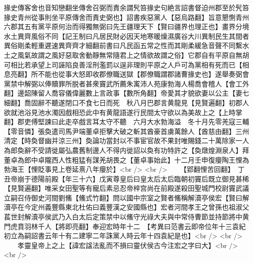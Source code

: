 掾史傳客舍也音知戀翻坐傳舍召弼而責余謂髠笞掾史句絶言詔書督迫州郡至於髠笞掾史青州從事則坐平原傳舍而責史弼也】詔書疾惡黨人【惡烏路翻】旨意懇惻青州六郡其五有黨平原何治而得獨無弼曰先王疆理天下【賢曰疆界也理正也】畫界分境水土異齊風俗不同【記王制曰凡居民財必因天地寒暖燥濕廣谷大川異制民生其間者異俗剛柔輕重遲速異齊齊才細翻前書曰凡民函五常之性而其剛柔緩急音聲不同繫水土之風氣故謂之風好惡取舍動靜無常隨君上之情欲故謂之俗】它郡自有平原自無胡可相比若承望上司誣陷良善淫刑濫罰以逞非理則平原之人戶可為黨相有死而已【相息亮翻】所不能也從事大怒即收郡僚職送獄【郡僚職謂郡諸曹掾史也】遂舉奏弼會黨禁中解弼以俸贖罪所脱者甚衆竇武所薦朱㝢沛人苑康勃海人楊喬會稽人【會工外翻】邊韶陳留人喬容儀偉麗數上言政事【數所角翻】帝愛其才貌欲妻以公主【妻七細翻】喬固辭不聽遂閉口不食七日而死　秋八月巴郡言黄龍見【見賢遍翻】初郡人欲就池浴見池水濁因戲相恐此中有黄龍語遂行民間太守欲以為美故上之【上時掌翻】郡吏傅堅諫曰此走卒戲言耳太守不聽　六月大水勃海溢　冬十月先零羌寇三輔【零音憐】張奐遣司馬尹端董卓拒擊大破之斬其酋豪首虜萬餘人【酋慈由翻】三州清定【時奐督幽并涼三州】奐論功當封以不事宦官故不果封唯賜錢二十萬除家一人為郎奐辭不受請徙屬弘農舊制邊人不得内徙詔以奐有功特許之【奐燉煌淵泉人】拜董卓為郎中卓隴西人性粗猛有謀羌胡畏之【董卓事始此】十二月壬申復癭陶王悝為勃海王【悝貶事見上卷延熹八年癭於】<br />
<br />
　　【郢翻悝苦回翻】　丁丑帝崩于德陽前殿【年三十六】戊寅尊皇后曰皇太后太后臨朝初竇后既立御見甚稀【見賢遍翻】唯采女田聖等有寵后素忌忍帝梓宫尚在前殿遂殺田聖城門校尉竇武議立嗣召侍御史河間劉鯈【鯈式竹翻】問以國中宗室之賢者鯈稱解瀆亭侯宏【賢曰解瀆亭在今定州義豐縣東北杜佑曰義豐漢之安國縣也】宏者河間孝王之曾孫也祖淑父萇世封解瀆亭侯武乃入白太后定策禁中以鯈守光祿大夫與中常侍曹節並持節將中黄門虎賁羽林千人【將即亮翻】奉迎宏時年十二　【考異曰范書云即帝位年十三袁紀初立為嗣詔書云年十有二建寧二年誅黨人時云年十四袁紀是也】<br />
<br />
　　孝靈皇帝上之上【諱宏諡法亂而不損曰靈伏侯古今注宏之字曰大】<br />
<br />
